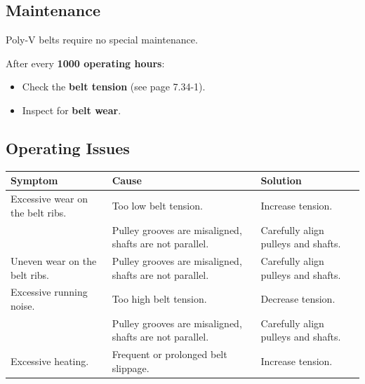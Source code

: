 
\newpage

\subsection*{Maintenance}

Poly-V belts require no special maintenance.


After every \textbf{1000 operating hours}:
\begin{itemize}
    \item Check the \textbf{belt tension} (see page 7.34-1).
    \item Inspect for \textbf{belt wear}.
\end{itemize}

\subsection*{Operating Issues}

\begin{table}[H]
    \centering
    \renewcommand{\arraystretch}{1.2}
    \begin{tabular}{|p{}|p{}|p{}|}
        \hline
        \textbf{Symptom} & \textbf{Cause} & \textbf{Solution} \\
        \hline
        Excessive wear on the belt ribs. & Too low belt tension. & Increase tension. \\
        \cline{2-3}
        & Pulley grooves are misaligned, shafts are not parallel. & Carefully align pulleys and shafts. \\
        \hline
        Uneven wear on the belt ribs. & Pulley grooves are misaligned, shafts are not parallel. & Carefully align pulleys and shafts. \\
        \hline
        Excessive running noise. & Too high belt tension. & Decrease tension. \\
        \cline{2-3}
        & Pulley grooves are misaligned, shafts are not parallel. & Carefully align pulleys and shafts. \\
        \hline
        Excessive heating. & Frequent or prolonged belt slippage. & Increase tension. \\
        \hline
    \end{tabular}
\end{table}

